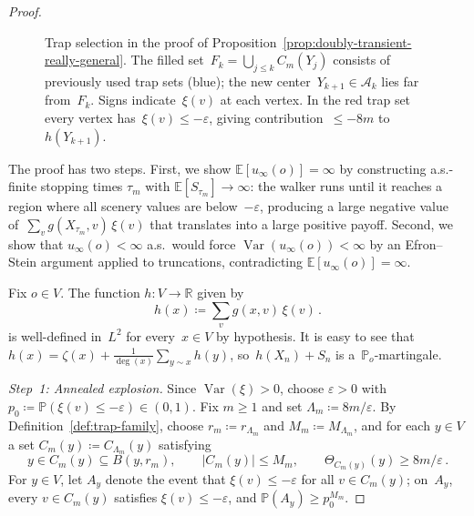 \documentclass[11pt]{amsart}
\theoremstyle{plain}
\theoremstyle{definition}
\newcommand{\R}{\mathbb{R}}
\newcommand{\E}{\mathbb{E}}
\renewcommand{\P}{\mathbb{P}}
\DeclareMathOperator{\var}{Var}
\begin{document}
\begin{proof}
\begin{figure}[ht]
			\caption{Trap selection in the proof of Proposition~\ref{prop:doubly-transient-really-general}. The filled set~$F_k=\bigcup_{j\leq k}C_m(Y_j)$ consists of previously used trap sets (blue); the new center~$Y_{k+1}\in\mathcal{A}_k$ lies far from~$F_k$. Signs indicate~$\xi(v)$ at each vertex. In the red trap set every vertex has~$\xi(v)\leq -\varepsilon$, giving contribution~$\leq -8m$ to~$h(Y_{k+1})$.}
			\label{fig:ball-selection}
		\end{figure}
		
		The proof has two steps. First, we show $\E[u_\infty(o)]=\infty$ by constructing a.s.-finite stopping times $\tau_m$ with $\E[S_{\tau_m}]\to\infty$: the walker runs until it reaches a region where all scenery values are below~$-\varepsilon$, producing a large negative value of~$\sum_v g(X_{\tau_m},v)\,\xi(v)$ that translates into a large positive payoff. Second, we show that $u_\infty(o)<\infty$ a.s.\ would force $\var(u_\infty(o))<\infty$ by an Efron--Stein argument applied to truncations, contradicting $\E[u_\infty(o)]=\infty$.
		
		Fix $o\in V$.
		The function $h\colon V\to\R$ given by
		\[
		h(x)\coloneqq\sum_v g(x,v)\,\xi(v)\,.
		\]
		is well-defined in~$L^2$ for every~$x\in V$ by hypothesis.
		It is easy to see that
		$h(x)=\zeta(x)+\frac{1}{\deg(x)}\sum_{y\sim x}h(y)$, so~$h(X_n)+S_n$ is a~$\P_o$-martingale.
		
		\emph{Step~1: Annealed explosion.}
		Since $\var(\xi)>0$, choose $\varepsilon>0$ with $p_0\coloneqq\P(\xi(v)\leq -\varepsilon)\in(0,1)$. Fix $m\geq 1$ and set $\Lambda_m\coloneqq 8m/\varepsilon$. By Definition~\ref{def:trap-family}, choose $r_m\coloneqq r_{\Lambda_m}$ and $M_m\coloneqq M_{\Lambda_m}$, and for each $y\in V$ a set $C_m(y)\coloneqq C_{\Lambda_m}(y)$ satisfying
		\[
		y\in C_m(y)\subseteq B(y,r_m),\qquad |C_m(y)|\leq M_m,\qquad\Theta_{C_m(y)}(y)\geq 8m/\varepsilon\,.
		\]
		For $y\in V$, let $A_y$ denote the event that $\xi(v)\leq -\varepsilon$ for all $v\in C_m(y)$; on~$A_y$, every $v\in C_m(y)$ satisfies $\xi(v)\leq-\varepsilon$, and $\P(A_y)\geq p_0^{M_m}$.
		

\end{proof}
\end{document}
